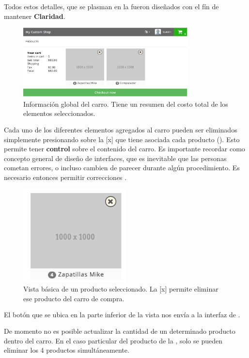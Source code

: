 		Todos estos detalles, que se plasman en la  fueron diseñados con el fín de mantener \textbf{Claridad}.

		\begin{figure}[H]
			\centering
			\includegraphics[width=0.8\textwidth]{figuras/solution/cart/view.png}
			\caption{Información global del carro. Tiene un resumen del costo total de los elementos seleccionados.}
			\label{figure:solution:cart:view}
		\end{figure}

		Cada uno de los diferentes elementos agregados al carro pueden ser eliminados simplemente presionando sobre la [x] que tiene asociada cada producto (). Esto permite tener \textbf{control} sobre el contenido del carro. Es importante recordar como concepto general de diseño de interfaces, que es inevitable que las personas cometan errores, o incluso cambien de parecer durante algún procedimiento. Es necesario entonces permitir correcciones \cite{online_goodgui_org}. 

		\begin{figure}[H]
			\centering
			\includegraphics[width=0.5\textwidth]{figuras/solution/cart/producto.png}
			\caption{Vista básica de un producto seleccionado. La [x] permite eliminar ese producto del carro de compra.}
			\label{figure:solution:cart:product}
		\end{figure}

		El botón \checkoutNowLABEL que se ubica en la parte inferior de la vista  nos envía a la interfaz de .

		De momento no es posible actualizar la cantidad de un determinado producto dentro del carro. En el caso particular del producto de la , solo se pueden eliminar los 4 productos simultáneamente.



